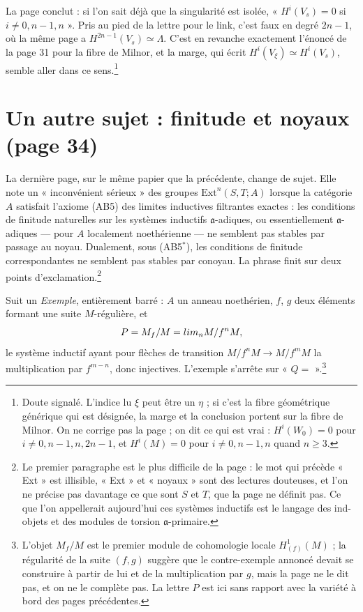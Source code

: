 \documentclass[11pt,a4paper]{article}
\begin{document}
La page conclut : si l'on sait déjà que la singularité est isolée,
« $H^{i}(V_{s}) = 0$ si $i \neq 0, n-1, n$ ». Pris au pied de la lettre pour
le link, c'est faux en degré $2n-1$, où la même page a
$H^{2n-1}(V_{s}) \simeq \Lambda$. C'est en revanche exactement l'énoncé de la
page 31 pour la fibre de Milnor, et la marge, qui écrit
$H^{i}(V_{\xi}) \simeq H^{i}(V_{s})$, semble aller dans ce sens.\footnote{Doute
signalé. L'indice lu $\xi$ peut être un $\eta$ ; si c'est la fibre
géométrique générique qui est désignée, la marge et la conclusion portent sur
la fibre de Milnor. On ne corrige pas la page ; on dit ce qui est vrai :
$H^{i}(W_0) = 0$ pour $i \neq 0, n-1, n, 2n-1$, et $H^{i}(M) = 0$ pour
$i \neq 0, n-1, n$ quand $n \geq 3$.}

\section*{Un autre sujet : finitude et noyaux (page 34)}

La dernière page, sur le même papier que la précédente, change de sujet. Elle
note un « inconvénient sérieux » des groupes $\mathrm{Ext}^{n}(S, T; A)$
lorsque la catégorie $A$ satisfait l'axiome (AB5) des limites inductives
filtrantes exactes : les conditions de finitude naturelles sur les systèmes
inductifs $\mathfrak{a}$-adiques, ou essentiellement $\mathfrak{a}$-adiques —
pour $A$ localement noethérienne — ne semblent pas stables par passage au
noyau. Dualement, sous (AB5$^{*}$), les conditions de finitude correspondantes
ne semblent pas stables par conoyau. La phrase finit sur deux points
d'exclamation.\footnote{Le premier paragraphe est le plus difficile de la page :
le mot qui précède « Ext » est illisible, « Ext » et « noyaux » sont des
lectures douteuses, et l'on ne précise pas davantage ce que sont $S$ et $T$,
que la page ne définit pas. Ce que l'on appellerait aujourd'hui ces systèmes
inductifs est le langage des ind-objets et des modules de torsion
$\mathfrak{a}$-primaire.}

Suit un \emph{Exemple}, entièrement barré : $A$ un anneau noethérien, $f$, $g$
deux éléments formant une suite $M$-régulière, et
\[
  P = M_{f}/M = \varinjlim_{n} M/f^{n}M,
\]
le système inductif ayant pour flèches de transition $M/f^{n}M \to M/f^{m}M$
la multiplication par $f^{m-n}$, donc injectives. L'exemple s'arrête sur
« $Q =$ ».\footnote{L'objet $M_{f}/M$ est le premier module de cohomologie
locale $H^{1}_{(f)}(M)$ ; la régularité de la suite $(f, g)$ suggère que le
contre-exemple annoncé devait se construire à partir de lui et de la
multiplication par $g$, mais la page ne le dit pas, et on ne le complète pas.
La lettre $P$ est ici sans rapport avec la variété à bord des pages
précédentes.}
\end{document}
